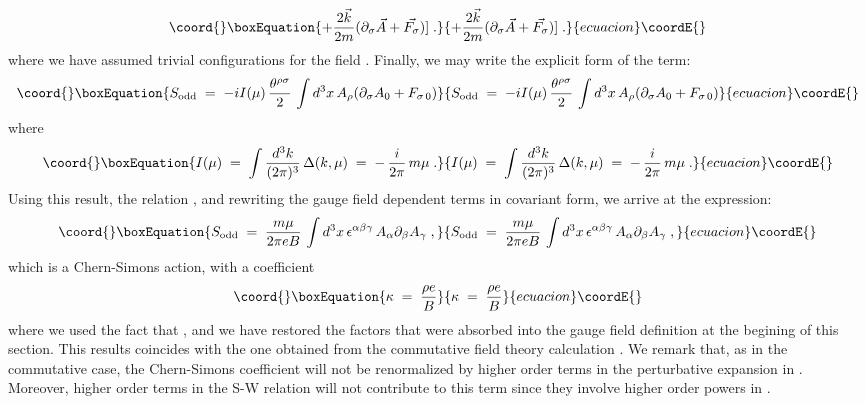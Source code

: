 \documentclass[a4paper,12pt]{article}
\begin{document}
\begin{equation}\coord{}\boxEquation{
+ \frac{2\vec{k}}{2m} (\partial_\sigma \vec{A} + \vec{F_\sigma})] 
\;.
}{
+ \frac{2\vec{k}}{2m} (\partial_\sigma \vec{A} + \vec{F_\sigma})] 
\;.
}{ecuacion}\coordE{}\end{equation}
where we have assumed trivial configurations for the field \coordHE{}. 
Finally, we may write the explicit form of the \coordHE{} term:
\begin{equation}\coord{}\boxEquation{
 S_{\mathrm{odd}} \;=\; - i I(\mu) \, \frac{\theta ^ {\rho \sigma}}{2} \, 
\int d^3x \, A_\rho (\partial_\sigma A_0 +F_{\sigma\,0}) 
}{
 S_{\mathrm{odd}} \;=\; - i I(\mu) \, \frac{\theta ^ {\rho \sigma}}{2} \, 
\int d^3x \, A_\rho (\partial_\sigma A_0 +F_{\sigma\,0}) 
}{ecuacion}\coordE{}\end{equation}
where
\begin{equation}\coord{}\boxEquation{
I(\mu)\;=\;\int \frac{d^3k}{(2\pi)^3}\, \Delta (k,\mu) \;=\; -\, \frac{i}{2\pi} \,  m \mu  \;.
}{
I(\mu)\;=\;\int \frac{d^3k}{(2\pi)^3}\, \Delta (k,\mu) \;=\; -\, \frac{i}{2\pi} \,  m \mu  \;.
}{ecuacion}\coordE{}\end{equation}
Using this result, the relation \coordHE{}, and rewriting the
gauge field dependent terms in covariant form, we arrive at the
expression:
\begin{equation}\coord{}\boxEquation{
  \label{eq:seffcs}
 S_{\mathrm{odd}} \;=\; \frac{m \mu}{2 \pi e B}  \, 
\int d^3x \, \epsilon^{\alpha\beta\gamma} \, A_\alpha \partial_\beta A_\gamma \;, 
}{
  S_{\mathrm{odd}} \;=\; \frac{m \mu}{2 \pi e B}  \, 
\int d^3x \, \epsilon^{\alpha\beta\gamma} \, A_\alpha \partial_\beta A_\gamma \;, 
}{ecuacion}\coordE{}\end{equation} 
which is a Chern-Simons action, with a coefficient 
\begin{equation}\coord{}\boxEquation{
\kappa \;=\; \frac{\rho e}{ B}
}{
\kappa \;=\; \frac{\rho e}{ B}
}{ecuacion}\coordE{}\end{equation}
where we used the fact that \coordHE{}, and we have 
restored the \coordHE{} factors that were absorbed into the gauge field 
definition at the begining of this section. This results
coincides with the one obtained from the commutative field theory
calculation \cite{lf}. We remark that, as in the commutative case, 
the Chern-Simons coefficient will not be renormalized by higher 
order terms in the perturbative expansion in \coordHE{}. Moreover, 
higher order terms in the S-W relation will not contribute to this 
term since they involve higher order powers in \myHighlight{$\theta$}\coordHE{}.
\end{document}
